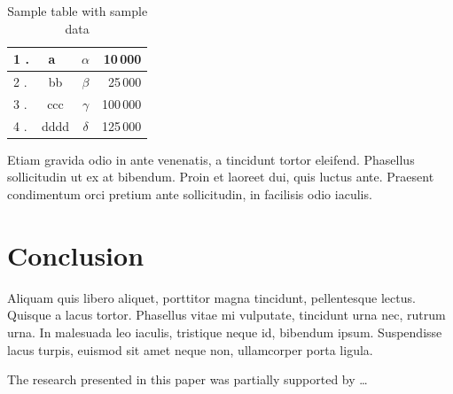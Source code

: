 \documentclass[10pt]{article}
\begin{document}
\begin{table}[!ht]
\centering
\caption{Sample table with sample data}
\label{tabl.1}
  \begin{tabular}{|l<{.}|c|>{$}c<{$}|r|}
                                 \hline
   1 & a~   & \alpha &  10\,000\\\hline
   2 & bb   & \beta  &  25\,000\\\hline
   3 & ccc  & \gamma & 100\,000\\\hline
   4 & dddd & \delta & 125\,000\\\hline
  \end{tabular}
\end{table}

Etiam gravida odio in ante venenatis, a tincidunt tortor eleifend. Phasellus sollicitudin ut ex at bibendum. Proin et laoreet dui, quis luctus ante. Praesent condimentum orci pretium ante sollicitudin, in facilisis odio iaculis. 


\section{Conclusion}

Aliquam quis libero aliquet, porttitor magna tincidunt, pellentesque lectus. Quisque a lacus tortor. Phasellus vitae mi vulputate, tincidunt urna nec, rutrum urna. In malesuada leo iaculis, tristique neque id, bibendum ipsum. Suspendisse lacus turpis, euismod sit amet neque non, ullamcorper porta ligula.

\begin{acknowledgements}
 The research presented in this paper was partially supported by \ldots
\end{acknowledgements}

\nocite{*} %



\end{document}
